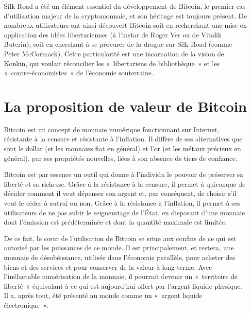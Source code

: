 Silk Road a été un élément essentiel du développement de Bitcoin, le premier cas d'utilisation majeur de la cryptomonnaie, et son héritage est toujours présent. De nombreux utilisateurs ont ainsi découvert Bitcoin soit en recherchant une mise en application des idées libertariennes (à l'instar de Roger Ver ou de Vitalik Buterin), soit en cherchant à se procurer de la drogue sur Silk Road (comme Peter McCormack). Cette particularité est une incarnation de la vision de Konkin, qui voulait réconcilier les «~libertariens de bibliothèque~» et les «~contre-économistes~» de l'économie souterraine.

\section*{La proposition de valeur de Bitcoin}

Bitcoin est un concept de monnaie numérique fonctionnant sur Internet, résistante à la censure et résistante à l'inflation. Il diffère de ses alternatives que sont le dollar (et les monnaies fiat en général) et l'or (et les métaux précieux en général), par ses propriétés nouvelles, liées à son absence de tiers de confiance. 

Bitcoin est par essence un outil qui donne à l'individu le pouvoir de préserver sa liberté et sa richesse. Grâce à la résistance à la censure, il permet à quiconque de décider comment il veut dépenser son argent et, par conséquent, de choisir s'il veut le céder à autrui ou non. Grâce à la résistance à l'inflation, il permet à ses utilisateurs de ne pas subir le seigneuriage de l'État, en disposant d'une monnaie dont l'émission est prédéterminée et dont la quantité maximale est limitée.

De ce fait, le cœur de l'utilisation de Bitcoin se situe aux confins de ce qui est autorisé par les puissances de ce monde. Il est principalement, et restera, une monnaie de désobéissance, utilisée dans l'économie parallèle, pour acheter des biens et des services et pour conserver de la valeur à long terme. Avec l'inéluctable numérisation de la monnaie, il pourrait devenir un «~territoire de liberté~» équivalant à ce qui est aujourd'hui offert par l'argent liquide physique. Il a, après tout, été présenté au monde comme un «~argent liquide électronique~».
